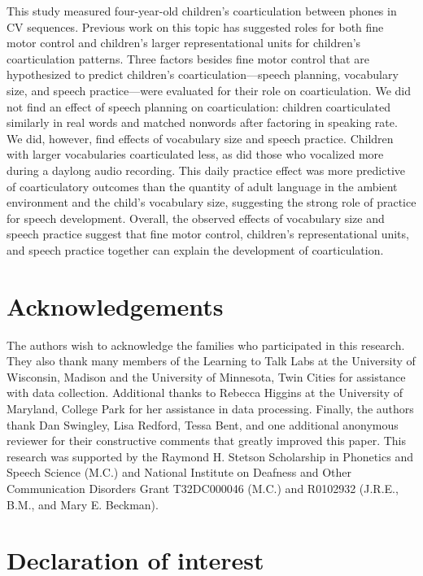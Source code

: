 \documentclass[a4paper,man,natbib,donotrepeattitle, apacite]{apa6}
\begin{document}
This study measured four-year-old children’s coarticulation between phones in CV sequences. Previous work on this topic has suggested roles for both fine motor control and children’s larger representational units for children’s coarticulation patterns. Three factors besides fine motor control that are hypothesized to predict children's coarticulation---speech planning, vocabulary size, and speech practice---were evaluated for their role on coarticulation. We did not find an effect of speech planning on coarticulation: children coarticulated similarly in real words and matched nonwords after factoring in speaking rate. We did, however, find effects of vocabulary size and speech practice. Children with larger vocabularies coarticulated less, as did those who vocalized more during a daylong audio recording. This daily practice effect was more predictive of coarticulatory outcomes than the quantity of adult language in the ambient environment and the child's vocabulary size, suggesting the strong role of practice for speech development. Overall, the observed effects of vocabulary size and speech practice suggest that fine motor control, children's representational units, and speech practice together can explain the development of coarticulation. 

\section{Acknowledgements}

The authors wish to acknowledge the families who participated in this research. They also thank many members of the Learning to Talk Labs at the University of Wisconsin, Madison and the University of Minnesota, Twin Cities for assistance with data collection. Additional thanks to Rebecca Higgins at the University of Maryland, College Park for her assistance in data processing. Finally, the authors thank Dan Swingley, Lisa Redford, Tessa Bent, and one additional anonymous reviewer for their constructive comments that greatly improved this paper. This research was supported by the Raymond H. Stetson Scholarship in Phonetics and Speech Science (M.C.) and National Institute on Deafness and Other Communication Disorders Grant T32DC000046 (M.C.) and R0102932 (J.R.E., B.M., and Mary E. Beckman).   

\section{Declaration of interest}
\end{document}
